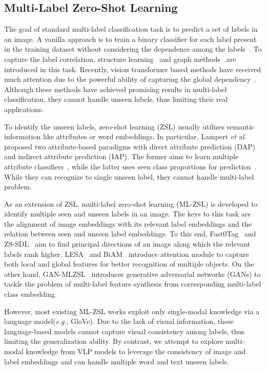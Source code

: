 \documentclass[letterpaper]{article} %
\newcommand{\eg}{\textit{e}.\textit{g}.}
\newcommand{\etal}{\emph{et al}.}
\begin{document}
\subsection{Multi-Label Zero-Shot Learning}
The goal of standard multi-label classification task is to predict a set of labels in an image.
A vanilla approach is to train a binary classifier for each label present in the training dataset without considering the dependence among the labels~\cite{tsoumakas2007multi, read2011classifier}.
To capture the label correlation, structure learning~\cite{gong2014deep,Wang_2016_CVPR,Zhu_2017_CVPR,Wang_2017_ICCV} and graph methods~\cite{Li_2016_CVPR,Lee_2018_CVPR,Chen_2019_CVPR} are introduced in this task.
Recently, vision transformer based methods have received much attention due to the powerful ability of  capturing the global dependency~\cite{lanchantin2021general,liu2021query2label,cheng2021mltr}.
Although these methods have achieved promising results in multi-label classification, they cannot handle unseen labels, thus limiting their real applications. \par
To identify the unseen labels, zero-shot learning (ZSL) usually utilizes semantic information like attributes or word embeddings\cite{mikolov2013distributed,Xian_2017_CVPR}.
In particular,
Lampert \etal~\cite{5206594} proposed two attribute-based paradigms with direct attribute prediction (DAP) and indirect attribute prediction (IAP).
The former aims to learn multiple attribute classifiers~\cite{6571196}, while the latter uses seen class proportions for prediction~\cite{Zhang_2015_ICCV}.
While they can recognize to single unseen label, they cannot handle multi-label problem.
\par
As an extension of ZSL,
multi-label zero-shot learning (ML-ZSL) is developed to identify multiple seen and unseen labels in an image.
The keys to this task are the alignment of image embeddings with its relevant label embeddings and the relation between seen and unseen label embeddings.
To this end, Fast0Tag~\cite{fast0tag} and ZS-SDL~\cite{zssdl} aim to find principal directions of an image along which the relevant labels rank higher.
LESA~\cite{lesa} and BiAM~\cite{biam} introduce attention module to capture both local and global features for better recognition of multiple objects.
On the other hand, GAN-MLZSL~\cite{ganmlzsl} introduces generative adversarial networks (GANs) to tackle the problem of multi-label feature synthesis from corresponding multi-label class embedding. \par
However, most existing ML-ZSL works exploit only single-modal knowledge via a language model(\eg, GloVe).
Due to the lack of visual information, these language-based models cannot capture visual consistency among labels, thus limiting the generalization ability.
By contrast, we attempt to explore multi-modal knowledge from VLP models to leverage the consistency of image and label embeddings and  can handle multiple word and text unseen labels.
\end{document}
